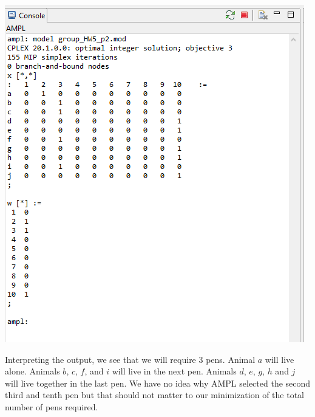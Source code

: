 \documentclass[11pt]{article}
\begin{document}
\begin{enumerate}
\includegraphics[width = .9\textwidth]{outputp2.png}

Interpreting the output, we see that we will require 3 pens.  Animal $a$ will live alone.  Animals $b$, $c$, $f$, and $i$ will live in the next pen.  Animals $d$, $e$, $g$, $h$ and $j$ will live together in the last pen.  We have no idea why AMPL selected the second third and tenth pen but that should not matter to our minimization of the total number of pens required.


\end{enumerate}
\end{document}
